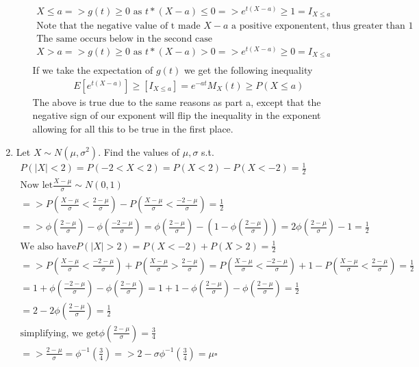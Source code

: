 \documentclass[11pt]{article}
\begin{document}
\begin{enumerate}
\begin{enumerate}
	\begin{gather}
	X\le a=> g(t)\ge 0 \text{ as } t*(X-a) \le 0 => e^{t(X-a)} \ge 1 = I_{X\le a}\\
	\text{Note that the negative value of t made $X-a$ a positive exponentent, thus greater than 1}\\
	\text{The same occurs below in the second case}\\
	X > a=> g(t)\ge 0 \text{ as } t*(X-a) > 0 => e^{t(X-a)} \ge 0 = I_{X \le a}\\
	\end{gather}
	If we take the expectation of $g(t)$ we get the following inequality\\
	\begin{gather}
	E[e^{t(X-a)}] \ge [I_{X\le a}] = e^{-at}M_X(t) \ge P(X\le a)
	\end{gather}
	The above is true due to the same reasons as part a, except that the negative sign of our exponent will flip the inequality in the exponent allowing for all this to be true in the first place.
\end{enumerate}
\item Let $X \sim N(\mu,\sigma^2)$. Find the values of $\mu,\sigma$ s.t.
\begin{gather}
	P(|X|<2) = P(-2<X<2) = P(X<2) - P(X<-2) =\frac{1}{2}\\
	\text{Now let} \frac{X-\mu}{\sigma} \sim N(0,1)\\
	=>  P(\frac{X-\mu}{\sigma}<\frac{2-\mu}{\sigma}) - P(\frac{X-\mu}{\sigma}<\frac{-2-\mu}{\sigma}) =\frac{1}{2}\\
	=> \phi(\frac{2-\mu}{\sigma}) - \phi(\frac{-2-\mu}{\sigma}) = \phi(\frac{2-\mu}{\sigma}) - (1-\phi(\frac{2-\mu}{\sigma})) = 2\phi(\frac{2-\mu}{\sigma})-1= \frac{1}{2}\\
	\text{We also have} P(|X|>2) = P(X<-2) + P(X>2) = \frac{1}{2}\\
	=>  P(\frac{X-\mu}{\sigma}<\frac{-2-\mu}{\sigma}) + P(\frac{X-\mu}{\sigma}>\frac{2-\mu}{\sigma}) = P(\frac{X-\mu}{\sigma}<\frac{-2-\mu}{\sigma}) + 1-P(\frac{X-\mu}{\sigma}<\frac{2-\mu}{\sigma}) =\frac{1}{2}\\
	 = 1+\phi(\frac{-2-\mu}{\sigma}) - \phi(\frac{2-\mu}{\sigma}) = 1+1-\phi(\frac{2-\mu}{\sigma})- \phi(\frac{2-\mu}{\sigma}) = \frac{1}{2}\\
	 = 2 - 2\phi(\frac{2-\mu}{\sigma}) = \frac{1}{2}\\
	 \text{simplifying, we get} \phi(\frac{2-\mu}{\sigma})=\frac{3}{4}\\
	 => \frac{2-\mu}{\sigma} = \phi^{-1}(\frac{3}{4}) => 2-\sigma\phi^{-1}(\frac{3}{4}) = \mu \square

\end{gather}
\end{enumerate}
\end{document}
